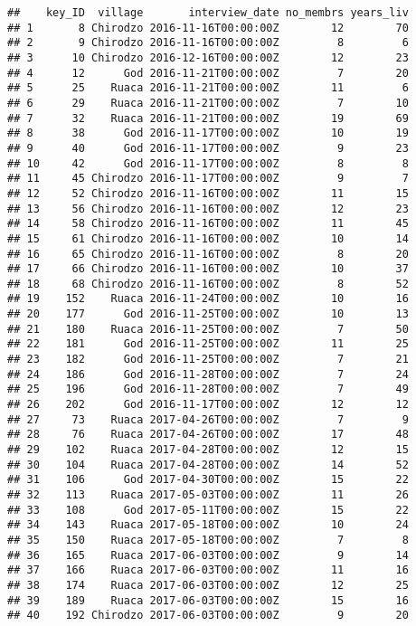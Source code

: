 \documentclass[
]{article}
\begin{document}
\begin{verbatim}
##    key_ID  village       interview_date no_membrs years_liv
## 1       8 Chirodzo 2016-11-16T00:00:00Z        12        70
## 2       9 Chirodzo 2016-11-16T00:00:00Z         8         6
## 3      10 Chirodzo 2016-12-16T00:00:00Z        12        23
## 4      12      God 2016-11-21T00:00:00Z         7        20
## 5      25    Ruaca 2016-11-21T00:00:00Z        11         6
## 6      29    Ruaca 2016-11-21T00:00:00Z         7        10
## 7      32    Ruaca 2016-11-21T00:00:00Z        19        69
## 8      38      God 2016-11-17T00:00:00Z        10        19
## 9      40      God 2016-11-17T00:00:00Z         9        23
## 10     42      God 2016-11-17T00:00:00Z         8         8
## 11     45 Chirodzo 2016-11-17T00:00:00Z         9         7
## 12     52 Chirodzo 2016-11-16T00:00:00Z        11        15
## 13     56 Chirodzo 2016-11-16T00:00:00Z        12        23
## 14     58 Chirodzo 2016-11-16T00:00:00Z        11        45
## 15     61 Chirodzo 2016-11-16T00:00:00Z        10        14
## 16     65 Chirodzo 2016-11-16T00:00:00Z         8        20
## 17     66 Chirodzo 2016-11-16T00:00:00Z        10        37
## 18     68 Chirodzo 2016-11-16T00:00:00Z         8        52
## 19    152    Ruaca 2016-11-24T00:00:00Z        10        16
## 20    177      God 2016-11-25T00:00:00Z        10        13
## 21    180    Ruaca 2016-11-25T00:00:00Z         7        50
## 22    181      God 2016-11-25T00:00:00Z        11        25
## 23    182      God 2016-11-25T00:00:00Z         7        21
## 24    186      God 2016-11-28T00:00:00Z         7        24
## 25    196      God 2016-11-28T00:00:00Z         7        49
## 26    202      God 2016-11-17T00:00:00Z        12        12
## 27     73    Ruaca 2017-04-26T00:00:00Z         7         9
## 28     76    Ruaca 2017-04-26T00:00:00Z        17        48
## 29    102    Ruaca 2017-04-28T00:00:00Z        12        15
## 30    104    Ruaca 2017-04-28T00:00:00Z        14        52
## 31    106      God 2017-04-30T00:00:00Z        15        22
## 32    113    Ruaca 2017-05-03T00:00:00Z        11        26
## 33    108      God 2017-05-11T00:00:00Z        15        22
## 34    143    Ruaca 2017-05-18T00:00:00Z        10        24
## 35    150    Ruaca 2017-05-18T00:00:00Z         7         8
## 36    165    Ruaca 2017-06-03T00:00:00Z         9        14
## 37    166    Ruaca 2017-06-03T00:00:00Z        11        16
## 38    174    Ruaca 2017-06-03T00:00:00Z        12        25
## 39    189    Ruaca 2017-06-03T00:00:00Z        15        16
## 40    192 Chirodzo 2017-06-03T00:00:00Z         9        20

\end{verbatim}
\end{document}

